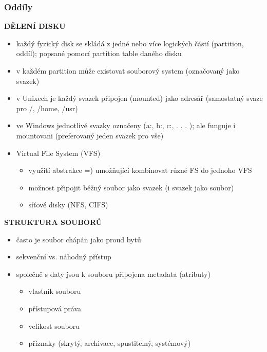 \documentclass[10pt,a4paper]{article}
\begin{document}
\subsubsection{Oddíly}
\textbf{DĚLENÍ DISKU}
\begin{itemize}
	\item každý fyzický disk se skládá z jedné nebo více logických částí (partition, oddíl); popsané
pomocí partition table daného disku
	\item v každém partition může existovat souborový system (označovaný jako svazek)
	\item v Unixech je každý svazek připojen (mounted) jako adresář (samostatný svaze pro /, /home,
/usr)
	\item ve Windows jednotlivé svazky označeny (a:, b:, c:, . . . ); ale funguje i mountovani (preferovaný
jeden svazek pro vše)
	\item Virtual File System (VFS)
	\begin{itemize}
		\item využití abstrakce =) umožňující kombinovat různé FS do jednoho VFS
		\item možnost připojit běžný soubor jako svazek (i svazek jako soubor)
		\item síťové disky (NFS, CIFS)
	\end{itemize}
\end{itemize}

\textbf{STRUKTURA SOUBORŮ}
\begin{itemize}
	\item často je soubor chápán jako proud bytů
	\item sekvenční vs. náhodný přístup
	\item společně s daty jsou k souboru připojena metadata (atributy)
	\begin{itemize}
		\item vlastník souboru
		\item přístupová práva
		\item velikost souboru
		\item příznaky (skrytý, archivace, spustitelný, systémový)
	\end{itemize}
\end{itemize}
\end{document}
